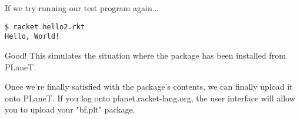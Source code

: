 \documentclass{article}
\begin{document}
If we try running our test program again...
\begin{verbatim}
$ racket hello2.rkt
Hello, World!
\end{verbatim}
Good! This simulates the situation where the package has been installed from PLaneT.

Once we’re finally satisfied with the package’s contents, we can finally upload it onto PLaneT. If you log onto planet.racket-lang.org, the user interface will allow you to upload your "bf.plt" package.
\end{document}
